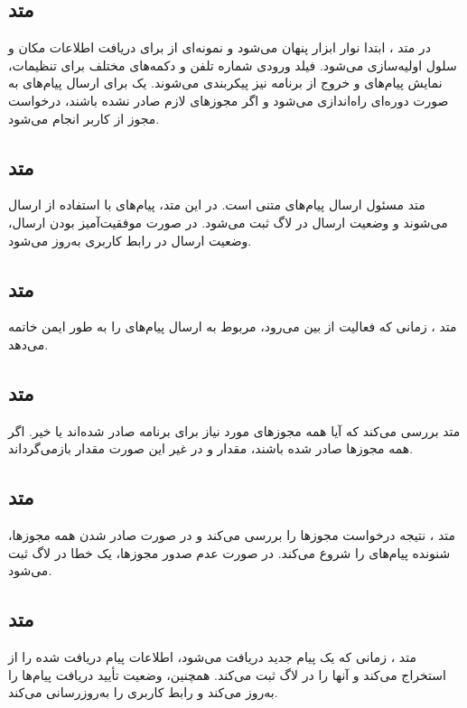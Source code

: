 \documentclass{report}
\begin{document}
\subsection{متد
}
در متد
 ، ابتدا نوار ابزار پنهان می‌شود و نمونه‌ای از
   برای دریافت اطلاعات مکان و سلول اولیه‌سازی می‌شود. فیلد ورودی شماره تلفن و دکمه‌های مختلف برای تنظیمات، نمایش پیام‌های 
    و خروج از برنامه نیز پیکربندی می‌شوند. یک
     برای ارسال پیام‌های 
      به صورت دوره‌ای راه‌اندازی می‌شود و اگر مجوزهای لازم صادر نشده باشند، درخواست مجوز از کاربر انجام می‌شود.

\subsection{متد
	}
متد
  مسئول ارسال پیام‌های متنی است. در این متد، پیام‌های
   با استفاده از
    ارسال می‌شوند و وضعیت ارسال در لاگ ثبت می‌شود. در صورت موفقیت‌آمیز بودن ارسال، وضعیت ارسال در رابط کاربری به‌روز می‌شود.

\subsection{متد
	}
متد
، زمانی که فعالیت از بین می‌رود،
 مربوط به ارسال پیام‌های
   را به طور ایمن خاتمه می‌دهد.
   
\subsection{متد
	}

متد 
 بررسی می‌کند که آیا همه مجوزهای مورد نیاز برای برنامه صادر شده‌اند یا خیر. اگر همه مجوزها صادر شده باشند، مقدار 
  و در غیر این صورت مقدار 
   بازمی‌گرداند.


\subsection{متد
}
متد
، نتیجه درخواست مجوزها را بررسی می‌کند و در صورت صادر شدن همه مجوزها، شنونده پیام‌های
 را شروع می‌کند. در صورت عدم صدور مجوزها، یک خطا در لاگ ثبت می‌شود.

\subsection{متد
}
متد 
، زمانی که یک پیام جدید دریافت می‌شود، اطلاعات پیام دریافت شده را از 
 استخراج می‌کند و آنها را در لاگ ثبت می‌کند. همچنین، وضعیت تأیید دریافت پیام‌ها را به‌روز می‌کند و رابط کاربری را به‌روزرسانی می‌کند.
\end{document}
